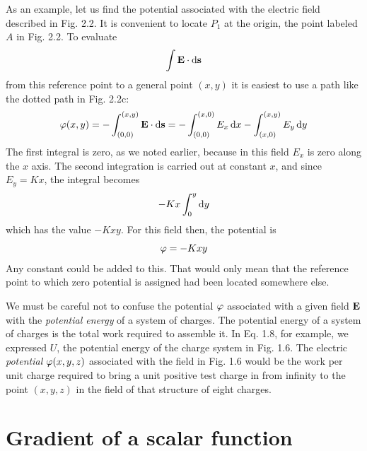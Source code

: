 As an example, let us find the potential associated with the electric
field described in Fig. 2.2. It is convenient to locate $P_1$ at the origin,
the point labeled $A$ in Fig. 2.2. To evaluate
\begin{equation}
  \int\mathbf{E}\cdot\operatorname{d\!}\mathbf{s}
\end{equation}
from this reference point to a general point $(x,y)$ it is easiest to use
a path like the dotted path in Fig. 2.2c:
\begin{equation}
  \varphi(x,y) = -\int_{(0,0)}^{(x,y)}\mathbf{E}\cdot\operatorname{d\!}\mathbf{s}
            = -\int_{(0,0)}^{(x,0)} E_x \operatorname{d\!} x - \int_{(x,0)}^{(x,y)} E_y \operatorname{d\!} y
\end{equation}
The first integral is zero, as we noted earlier, because in this field $E_x$
is zero along the $x$ axis. The second integration is carried out at constant
$x$, and since $E_y = Kx$, the integral becomes
\begin{equation}
  -Kx\int_0^y \operatorname{d\!} y
\end{equation}
which has the value $-Kxy$. For this field then, the potential is
\begin{equation}
  \varphi = -Kxy
\end{equation}
Any constant could be added to this. That would only mean that the
reference point to which zero potential is assigned had been located
somewhere else.

We must be careful not to confuse the potential $\varphi$ associated with
a given field $\mathbf{E}$ with the \emph{potential energy} of a system of charges. The
potential energy of a system of charges is the total work required to
assemble it. In Eq. 1.8, for example, we expressed $U$, the potential
energy of the charge system in Fig. 1.6. The electric \emph{potential}
$\varphi(x,y,z)$ associated with the field in Fig. 1.6 would be the work per
unit charge required to bring a unit positive test charge in from infinity
to the point $(x,y,z)$ in the field of that structure of eight charges.

\section{Gradient of a scalar function}

